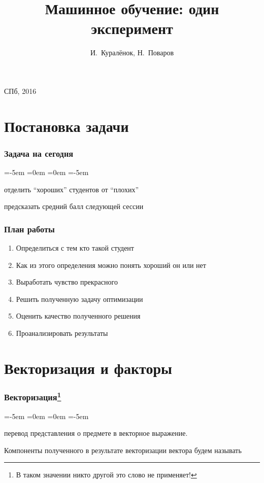 \documentclass[14pt, fleqn, xcolor={dvipsnames, table}, hyperref={unicode}, babel={english,russian}, inputenc=utf8x]{beamer}
\title{Машинное обучение: один эксперимент\\\small{}}
\author[]{\small{%
И.~Куралёнок,
Н.~Поваров}}
\date{}
\begin{document}
\begin{frame}
\maketitle
\small
\begin{center}
\vspace{-60pt}
\vspace{80pt}
\footnotesize СПб, 2016
\end{center}
\end{frame}

\section{Постановка задачи}
\begin{frame}
\frametitle{Задача на сегодня}
\begin{description}
\leftmargin=-5em
\itemindent=0em
=0em
\leftskip=-5em
\item[Задача:] отделить ``хороших'' студентов от ``плохих''
\item
\item[Формально:] предсказать средний балл следующей сессии
\end{description}
\end{frame}

\begin{frame}
\frametitle{План работы}
\begin{enumerate}
\item Определиться с тем кто такой студент
\item Как из этого определения можно понять хороший он или нет
\item Выработать чувство прекрасного
\item Решить полученную задачу оптимизации
\item Оценить качество полученного решения
\item Проанализировать результаты
\end{enumerate}
\end{frame}

\section{Векторизация и факторы}
\begin{frame}
\frametitle{Векторизация\footnote{В таком значении никто другой это слово не применяет!}}
\begin{description}
\leftmargin=-5em
\itemindent=0em
=0em
\leftskip=-5em
\item[Векторизация:] перевод представления о предмете в векторное выражение.
\item[]
\item[] Компоненты полученного в результате векторизации вектора будем называть {}
\end{description}
\end{frame}
\end{document}
